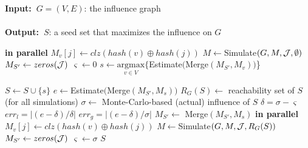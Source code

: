 \documentclass[review]{elsarticle}
\renewcommand{\algorithmicrequire}{\textbf{Input:~}}
\renewcommand{\algorithmicensure}{\textbf{Output:~}}
\newcommand\acro{{\sc{HyperFuseR\xspace}\xspace}\xspace}
\newcommand\kktodo[1]{\textcolor{red}{#1}}
\begin{document}
\renewcommand{\baselinestretch}{0.95}
\begin{algorithm}
\caption{\sc{\acro}($G,K,{\cal J}$)}
\label{algo:main}
\algorithmicrequire{$G = (V,E)$: the influence graph
\\\\}
\algorithmicensure{$S$: a seed set that maximizes the influence on $G$
}
\begin{algorithmic}[1]
     {\bf in parallel}
            \State $M_v[j] \leftarrow clz(hash(v) \oplus hash(j))$ 
        \EndFor
    \EndFor
    \State $M \leftarrow ${\sc Simulate}$(G,M,{\cal J},\emptyset)$
    \State $M_{S'} \leftarrow zeros({\cal J})$
    \State $\varsigma \leftarrow 0$
     \label{line:for}
        \State $s \leftarrow \underset{v\in V}{\mathrm{argmax}}\{${\sc Estimate}$(${\sc Merge}$(M_{S'},M_v))$\}\label{line:estimate}
        
        \State $S \leftarrow S \cup \{s\}$     
        \State $e \leftarrow ${\sc Estimate}$(${\sc Merge}$(M_{S'},M_s))$\label{line:e}
        \State $R_G(S) \leftarrow$ reachability set of $S$ (for all simulations)
        \State $\sigma \leftarrow$ Monte-Carlo-based (actual) influence of $S$
        \State $\delta = \sigma - \varsigma$
        \State $err_l=|(e - \delta) / \delta|$
        \State $err_g=|(e-\delta) / \sigma|$
            \State $M_{S'} \leftarrow$ {\sc Merge}$(M_{S'},M_s)$ \label{line:if}
        \Else 
             {\bf in parallel}\label{line:else1}
                    \State $M_v[j] \leftarrow clz(hash(v) \oplus hash(j))$ 
                \EndFor
            \EndFor
            \State $M \leftarrow ${\sc Simulate}$(G,M,{\cal J},R_{G}(S))$
            \State $M_{S'} \leftarrow zeros({\cal J}) $ 
            \State $\varsigma \leftarrow \sigma $ \label{line:else2} 
        \EndIf
    \EndFor
    \State \Return $S$
\end{algorithmic}
\end{algorithm}
\renewcommand{\baselinestretch}{1}
\end{document}
